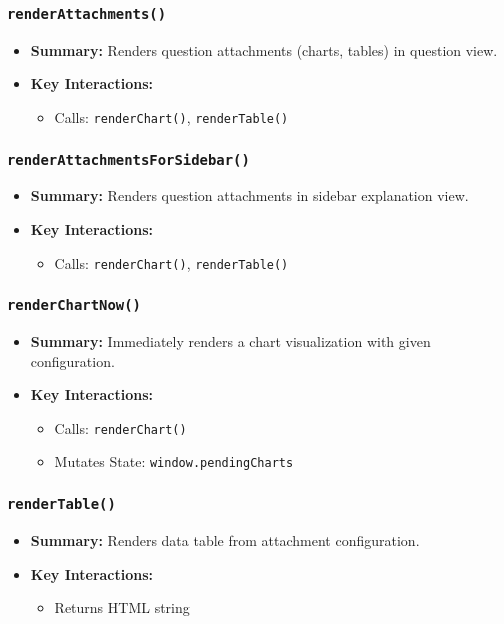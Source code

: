 \documentclass[11pt,letterpaper]{article}
\begin{document}
\subsubsection{\texttt{renderAttachments()}}
\begin{itemize}
    \item \textbf{Summary:} Renders question attachments (charts, tables) in question view.
    \item \textbf{Key Interactions:}
    \begin{itemize}
        \item Calls: \texttt{renderChart()}, \texttt{renderTable()}
    \end{itemize}
\end{itemize}

\subsubsection{\texttt{renderAttachmentsForSidebar()}}
\begin{itemize}
    \item \textbf{Summary:} Renders question attachments in sidebar explanation view.
    \item \textbf{Key Interactions:}
    \begin{itemize}
        \item Calls: \texttt{renderChart()}, \texttt{renderTable()}
    \end{itemize}
\end{itemize}

\subsubsection{\texttt{renderChartNow()}}
\begin{itemize}
    \item \textbf{Summary:} Immediately renders a chart visualization with given configuration.
    \item \textbf{Key Interactions:}
    \begin{itemize}
        \item Calls: \texttt{renderChart()}
        \item Mutates State: \texttt{window.pendingCharts}
    \end{itemize}
\end{itemize}

\subsubsection{\texttt{renderTable()}}
\begin{itemize}
    \item \textbf{Summary:} Renders data table from attachment configuration.
    \item \textbf{Key Interactions:}
    \begin{itemize}
        \item Returns HTML string
    \end{itemize}
\end{itemize}
\end{document}
